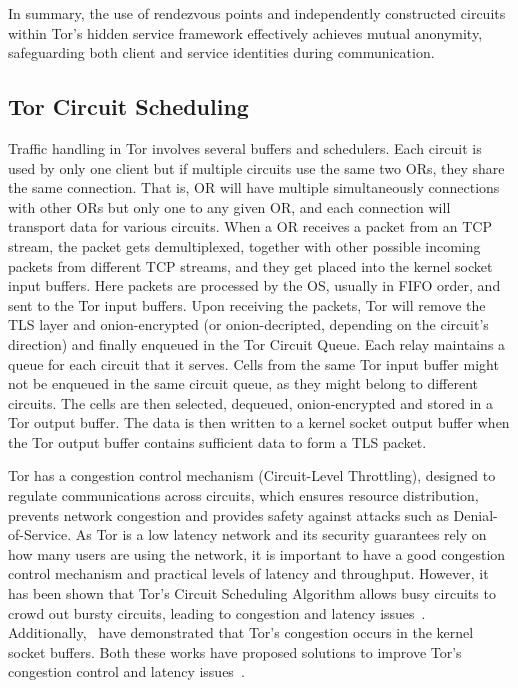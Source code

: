 In summary, the use of rendezvous points and independently constructed circuits within Tor's hidden service framework effectively achieves mutual anonymity, safeguarding both client and service identities during communication.

\subsection{Tor Circuit Scheduling}\label{subsec:tor_scheduler}

Traffic handling in Tor involves several buffers and schedulers.
Each circuit is used by only one client but if multiple circuits use the same two ORs, they share the same connection. That is, OR will have multiple simultaneously connections with other ORs but only one to any given OR, and each connection will transport data for various circuits. 
When a OR receives a packet from an TCP stream, the packet gets demultiplexed, together with other possible incoming packets from different TCP streams, and they get placed into the kernel socket input buffers. Here packets are processed by the OS, usually in FIFO order, and sent to the Tor input buffers. Upon receiving the packets, Tor will remove the TLS layer and onion-encrypted (or onion-decripted, depending on the circuit's direction) and finally enqueued in the Tor Circuit Queue. Each relay maintains a queue for each circuit that it serves. Cells from the same Tor input buffer might not be enqueued in the same circuit queue, as they might belong to different circuits. The cells are then selected, dequeued, onion-encrypted and stored in a Tor output buffer. The data is then written to a kernel socket output buffer when the Tor output buffer contains sufficient data to form a TLS packet.

Tor has a congestion control mechanism (Circuit-Level Throttling), designed to regulate communications across circuits, which ensures resource distribution, prevents network congestion and provides safety against attacks such as Denial-of-Service. As Tor is a low latency network and its security guarantees rely on how many users are using the network, it is important to have a good congestion control mechanism and practical levels of latency and throughput. However, it has been shown that Tor's Circuit Scheduling Algorithm allows busy circuits to crowd out bursty circuits, leading to congestion and latency issues~\cite{EWMA}. Additionally,~\citeauthor{KIST} have demonstrated that Tor's congestion occurs in the kernel socket buffers. Both these works have proposed solutions to improve Tor's congestion control and latency issues~\cite{KIST}.

